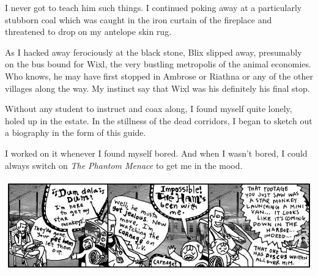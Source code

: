 \documentclass[10pt,twoside]{report}
\begin{document}
I never got to teach him such things.  I continued poking away at a
particularly stubborn coal which was caught in the iron curtain of the
fireplace and threatened to drop on my antelope skin rug.

As I hacked away ferociously at the black stone, Blix slipped away,
presumably on the bus bound for Wixl, the very bustling metropolis of
the animal economies.  Who knows, he may have first stopped in Ambrose
or Riathna or any of the other villages along the way.  My instinct
say that Wixl was his definitely his final stop.

Without any student to instruct and coax along, I found myself quite
lonely, holed up in the estate.  In the stillness of the dead
corridors, I began to sketch out a biography in the form of this
guide.

I worked on it whenever I found myself bored.  And when I wasn't
bored, I could always switch on {\em The Phantom Menace} to get me in
the mood.

	\includegraphics[width=1.0\textwidth]{cache/31.png}
\newpage
\thispagestyle{empty}
\mbox{}
\cleartooddpage
\end{document}
